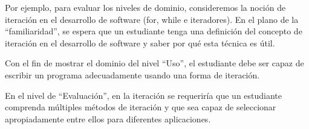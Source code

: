 Por ejemplo, para evaluar los niveles de dominio, consideremos la noción de iteración en el desarrollo de software (for, while e iteradores). 
En el plano de la ``familiaridad'', se espera que un estudiante tenga una definición del 
concepto de iteración en el desarrollo de software y saber por qué esta técnica es útil. 

Con el fin de mostrar el dominio del nivel ``Uso'', el estudiante debe ser capaz de 
escribir un programa adecuadamente usando una forma de iteración. 

En el nivel de ``Evaluación'', en la iteración se requeriría que un estudiante comprenda múltiples métodos de iteración y 
que sea capaz de seleccionar apropiadamente entre ellos para diferentes aplicaciones.

